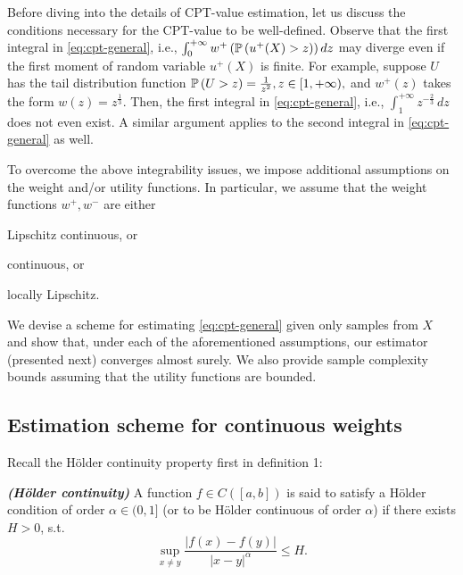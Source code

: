 
Before diving into the details of CPT-value estimation, let us discuss the conditions necessary for the CPT-value to be well-defined.
Observe that the first integral in \eqref{eq:cpt-general}, i.e., 
$\int_0^{+\infty} w^+\left(\mathbb{P}\left( u^+(X)>z \right)\right) d z$
may diverge even if the first moment of random variable $u^+(X)$ is finite. 
For example, suppose $U$ has the tail distribution function
$\mathbb{P}\left( U>z \right)  = \frac{1}{z^2}, z\in [1, +\infty),$
 and $w^+(z)$ takes the form $w(z) = z^{\frac{1}{3}}$. Then, the first integral in \eqref{eq:cpt-general}, i.e.,
$
\int_1^{+\infty}  z^{-\frac{2}{3}}\, dz
$
does not even exist. A similar argument applies to the second integral in \eqref{eq:cpt-general} as well.

To overcome the above integrability issues, we impose additional  assumptions on the weight and/or utility functions. In particular, we assume that the weight functions $w^+, w^-$ are either 
\begin{inparaenum}[\it (i)]
\item Lipschitz continuous, or
\item \holder continuous, or
\item locally Lipschitz.
\end{inparaenum}
We devise a scheme for estimating \eqref{eq:cpt-general} given only samples from $X$ and show that, under each of the aforementioned assumptions, our estimator (presented next) converges almost surely. 
We also provide sample complexity bounds assuming that the utility functions are bounded.

\subsection{Estimation scheme for \holder continuous weights}
Recall the H\"{o}lder continuity property first in definition 1:
\begin{definition}\label{holder}
{\textbf{\textit{(H\"{o}lder continuity)}}}
A function $f \in C([a,b])$ is said to satisfy
a H\"{o}lder condition of order $\alpha\in (0,1]$ (or to be H\"{o}lder continuous
of order $\alpha$) if there exists $ H>0$, s.t.
\[
\sup_{x \neq y} \frac{| f(x) - f(y) |}{| x-y |^{\alpha}} \leq H .
\]
\end{definition}

